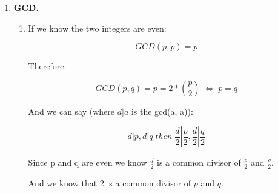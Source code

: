 \documentclass{article}
\DeclareRobustCommand\iff{\;\Longleftrightarrow\;}
\begin{document}
\begin{enumerate}
\begin{enumerate}
\begin{lstlisting}
def in_tup(p, path):
    for i in range(len(p)):
        if p[i][0] is not path[i][0]:
            return False
    return True

for i in range(len(forest.forest)):
    verticies = len(forest.forest_dicts[i][0])
    data = forest.forest[i]
    graph_dict = forest.forest_dicts[i][1]
    g = Graph(verticies, graph_dict)
    g.graph = data
    
    # Find max possible paths.
    for vertex in graph_dict:
        paths = g.dfs((vertex, 0))
        for p in paths:
            length = len(p)
            if length >= max_length:
                if length > max_length:
                    max_paths = []
                    max_length = length                
                if not in_path_list(p, max_paths):
                    max_paths.append(p)
                    
print("\nMax paths that exist in GraphData.txt have a length of {}.".format(len(max_paths[0])))
# Print Possible Paths
for p in max_paths:
    s = ""
    for t in p:            
        s += str(graph_dict[t[0]]) + " -> "
    s = s[:-3]
    print(s)            
        \end{lstlisting}

        So using this code we have found the \textbf{maximum path length is 0, and 0 separate paths have that length}. Below are the actual paths of such length (See "5\textbackslash5a\_Output.txt" for full output).

    \end{enumerate}
    
    \item \textbf{GCD}.
    
    \begin{enumerate}
        \item If we know the two integers are even:
        
        \[GCD(p, p) = p\]
        
        Therefore:

        \[GCD(p, q) = p = 2 * (\frac{p}{2}) \iff p = q\]

        And we can say (where $d|a$ is the gcd(a, a)):

        \[d|p, d|q\;then\;\frac{d}{2}|\frac{p}{2}, \frac{d}{2}|\frac{q}{2}\]

        Since p and q are even we know $\frac{d}{2}$ is a common divisor of $\frac{p}{2}$ and $\frac{q}{2}$.

        And we know that 2 is a common divisor of $p$ and $q$.


\end{enumerate}
\end{enumerate}
\end{document}
